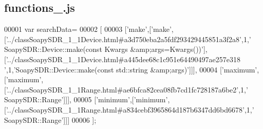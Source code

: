 \subsection{functions\+\_.\+js}
\label{functions__9_8js_source}

\begin{DoxyCode}
00001 var searchData=
00002 [
00003   [\textcolor{stringliteral}{'make'},[\textcolor{stringliteral}{'make'},[\textcolor{stringliteral}{'../classSoapySDR\_1\_1Device.html#a3d750eba2a5fdf293429445851a3f2a8'},1,\textcolor{stringliteral}{'
      SoapySDR::Device::make(const Kwargs &amp;args=Kwargs())'}],[\textcolor{stringliteral}{'../classSoapySDR\_1\_1Device.html#a445dee68c1c951e64490497ae257e318
      '},1,\textcolor{stringliteral}{'SoapySDR::Device::make(const std::string &amp;args)'}]]],
00004   [\textcolor{stringliteral}{'maximum'},[\textcolor{stringliteral}{'maximum'},[\textcolor{stringliteral}{'../classSoapySDR\_1\_1Range.html#ae6bfca82cea08fb7cd1fc728187a6be2'},1,\textcolor{stringliteral}{'
      SoapySDR::Range'}]]],
00005   [\textcolor{stringliteral}{'minimum'},[\textcolor{stringliteral}{'minimum'},[\textcolor{stringliteral}{'../classSoapySDR\_1\_1Range.html#a834cebf3965864d187b6347dd6bd6678'},1,\textcolor{stringliteral}{'
      SoapySDR::Range'}]]]
00006 ];
\end{DoxyCode}
